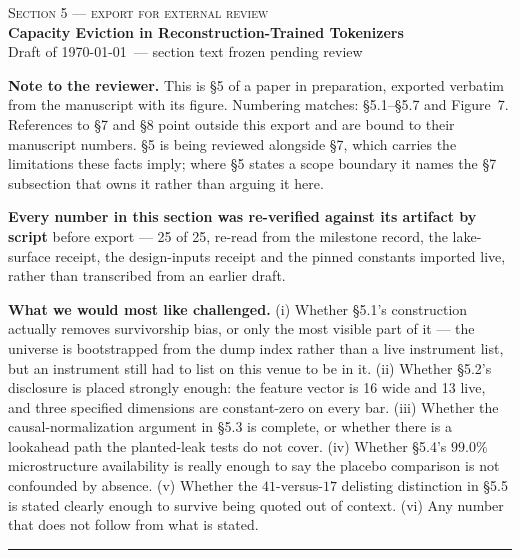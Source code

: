 \documentclass[10pt]{article}
\author{}
\date{}
\begin{document}
\makeatletter
{}
\makeatother

\setcounter{section}{4}   %
\setcounter{figure}{6}    %
\setcounter{table}{0}

{\centering
{\normalsize\textsc{Section 5 --- export for external review}}\\[0.5em]
{\Large\bfseries Capacity Eviction in Reconstruction-Trained Tokenizers}\\[0.4em]
{\small\color{tolgrey} Draft of \today\ --- section text frozen pending review}\\[1.6em]
}

\noindent\textbf{Note to the reviewer.} This is \S5 of a paper in preparation, exported verbatim
from the manuscript with its figure. Numbering matches: \S5.1--\S5.7 and Figure~7. References to
\S7 and \S8 point outside this export and are bound to their manuscript numbers. \S5 is being
reviewed alongside \S7, which carries the limitations these facts imply; where \S5 states a scope
boundary it names the \S7 subsection that owns it rather than arguing it here.

\medskip
\noindent\textbf{Every number in this section was re-verified against its artifact by script}
before export --- 25 of 25, re-read from the milestone record, the lake-surface receipt, the
design-inputs receipt and the pinned constants imported live, rather than transcribed from an
earlier draft.

\medskip
\noindent\textbf{What we would most like challenged.} (i) Whether \S5.1's construction actually
removes survivorship bias, or only the most visible part of it --- the universe is bootstrapped
from the dump index rather than a live instrument list, but an instrument still had to list on
this venue to be in it. (ii) Whether \S5.2's disclosure is placed strongly enough: the feature
vector is 16 wide and 13 live, and three specified dimensions are constant-zero on every bar.
(iii) Whether the causal-normalization argument in \S5.3 is complete, or whether there is a
lookahead path the planted-leak tests do not cover. (iv) Whether \S5.4's $99.0\%$ microstructure
availability is really enough to say the placebo comparison is not confounded by absence.
(v) Whether the $41$-versus-$17$ delisting distinction in \S5.5 is stated clearly enough to
survive being quoted out of context. (vi) Any number that does not follow from what is stated.

\bigskip
\hrule
\bigskip




\clearpage


\end{document}
